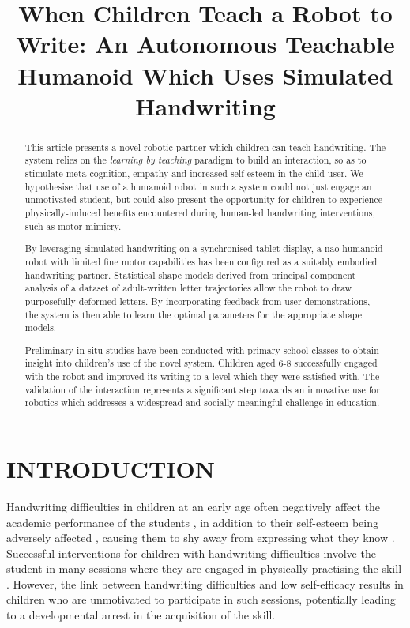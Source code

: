 \documentclass{sig-alternate}
\title{\LARGE \bf
When Children Teach a Robot to Write: An Autonomous Teachable Humanoid Which Uses Simulated Handwriting
}
\begin{document}
\maketitle

\begin{abstract}

This article presents a novel robotic partner which children can teach
handwriting.  The system relies on the \emph{learning by teaching} paradigm to
build an interaction, so as to stimulate meta-cognition, empathy and
increased self-esteem in the child user.  We hypothesise that use of a
humanoid robot in such a system could not just engage an unmotivated student,
but could also present the opportunity for children to experience
physically-induced benefits encountered during human-led handwriting
interventions, such as motor mimicry.

By leveraging simulated handwriting on a synchronised tablet display, a {\sc
nao} humanoid robot with limited fine motor capabilities has been configured as
a suitably embodied handwriting partner. Statistical shape models derived from
principal component analysis of a dataset of adult-written letter trajectories
allow the robot to draw purposefully deformed letters. By incorporating feedback
from user demonstrations, the system is then able to learn the optimal
parameters for the appropriate shape models. 

Preliminary in situ studies have been conducted with primary school classes to
obtain insight into children's use of the novel system.  Children aged 6-8
successfully engaged with the robot and improved its writing to a level which
they were satisfied with. The validation of the interaction represents a
significant step towards an innovative use for robotics which addresses a
widespread and socially meaningful challenge in education. 

\end{abstract}


\section{INTRODUCTION}

Handwriting difficulties in children at an early age often negatively affect the
academic performance of the students \cite{Christensen2005}, in addition to
their self-esteem being adversely affected \cite{Malloy1995}, causing them to
shy away from expressing what they know \cite{Medwell2008}.  Successful
interventions for children with handwriting difficulties involve the student in
many sessions where they are engaged in physically practising the skill
\cite{Hoy2011}. However, the link between handwriting difficulties and low
self-efficacy \cite{Engel-Yeger2009} results in children who are unmotivated to
participate in such sessions, potentially leading to a developmental arrest in
the acquisition of the skill. 
\end{document}
